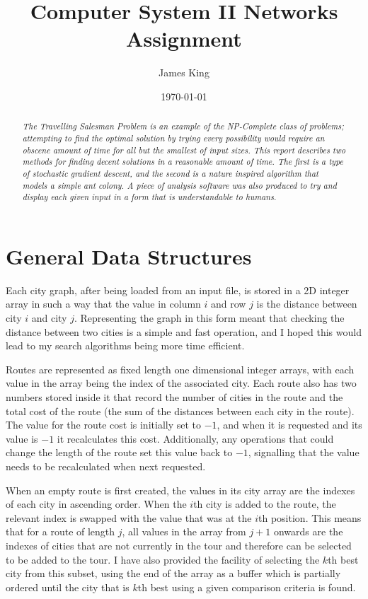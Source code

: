 \documentclass[a4paper,11pt]{article}
\title{Computer System II Networks Assignment}
\date{\today}
\author{James King}
\begin{document}
\maketitle

\begin{abstract}
\emph{The Travelling Salesman Problem is an example of the NP-Complete class of
problems; attempting to find the optimal solution by trying every possibility
would require an obscene amount of time for all but the smallest of input
sizes. This report describes two methods for finding decent solutions in a 
reasonable amount of time. The first is a type of stochastic gradient descent,
and the second is a nature inspired algorithm that models a simple ant colony.
A piece of analysis software was also produced to try and display each given
input in a form that is understandable to humans.}
\end{abstract}

\section{General Data Structures}
Each city graph, after being loaded from an input file, is stored in a 2D
integer array in such a way that the value in column $i$ and row $j$ is the
distance between city $i$ and city $j$. Representing the graph in this form
meant that checking the distance between two cities is a simple and fast
operation, and I hoped this would lead to my search algorithms being more time
efficient.

Routes are represented as fixed length one dimensional integer arrays, with
each value in the array being the index of the associated city. Each route also
has two numbers stored inside it that record the number of cities in the route
and the total cost of the route (the sum of the distances between each city in
the route). The value for the route cost is initially set to $-1$, and when it
is requested and its value is $-1$ it recalculates this cost. Additionally, any
operations that could change the length of the route set this value back to
$-1$, signalling that the value needs to be recalculated when next requested.

When an empty route is first created, the values in its city array are the
indexes of each city in ascending order. When the $i$th city is added to the
route, the relevant index is swapped with the value that was at the $i$th
position. This means that for a route of length $j$, all values in the array
from $j+1$ onwards are the indexes of cities that are not currently in the tour
and therefore can be selected to be added to the tour. I have also provided the
facility of selecting the $k$th best city from this subset, using the end of
the array as a buffer which is partially ordered until the city that is $k$th
best using a given comparison criteria is found.
\end{document}
